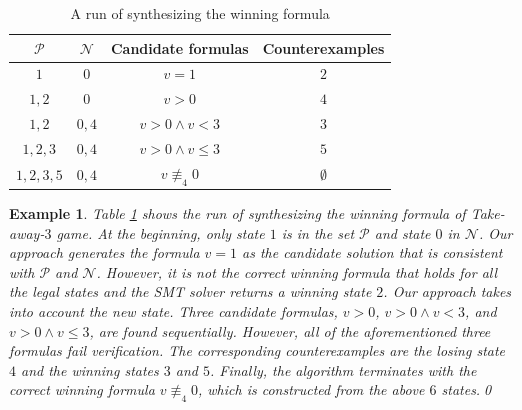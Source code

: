 \documentclass[review]{elsarticle}
\newcommand{\tuple}[1]{\langle {#1} \rangle}
\newcommand{\statevar}{\mathcal{X}}
\newcommand{\positiveSet}{\mathcal{P}}
\newcommand{\negativeSet}{\mathcal{N}}
\newcommand{\act}{\mathcal{A}}
\newcommand{\constraint}{\mathcal{C}}
\newcommand{\estate}{\mathcal{E}}
\newcommand{\nmodulo}{\not \equiv}
\newtheorem{example}{Example}
\newtheorem{theorem}{Theorem}
\begin{document}
        
        \begin{table}[!t]        	
		\small
        \centering        	
        	\begin{tabular}{|c|c|c|c|}
        		\hline
        		$\positiveSet$ & $\negativeSet$ & Candidate formulas & Counterexamples \\ \hline
        		$1$ & $0$ & $v = 1$ & $2$ \\ \hline
        		$1, 2$ & $0$ & $v > 0$ & $4$ \\ \hline
        		$1, 2$ & $0,4$ & $v > 0 \land v < 3$ & $3$\\ \hline
        		$1, 2, 3$ & $0,4$ & $v > 0 \land v \leq 3$ & $5$\\ \hline
				$1, 2, 3, 5$ & $0,4$ & $v \nmodulo_4 0$ & $\emptyset$\\ \hline
        	\end{tabular}
        	\caption{A run of synthesizing the winning formula}
        	\label{table:synWinForm}
        \end{table}

%    	
%
    
        \begin{example} \label{exm:synWinForm} \rm 
        Table \ref{table:synWinForm} shows the run of synthesizing the winning formula of Take-away-$3$ game.
        At the beginning, only state $1$ is in the set $\positiveSet$ and state $0$ in $\negativeSet$.
		Our approach generates the formula $v = 1$ as the candidate solution that is consistent with $\positiveSet$ and $\negativeSet$.
		However, it is not the correct winning formula that holds for all the legal states and the SMT solver returns a winning state $2$.
		Our approach takes into account the new state.
		Three candidate formulas, $v > 0$, $v > 0  \land  v < 3$, and $v > 0 \land v \leq 3$, are found sequentially.
		However, all of the aforementioned three formulas fail verification.
		The corresponding counterexamples are the losing state $4$ and the winning states $3$ and $5$.
        Finally, the algorithm terminates with the correct winning formula $v \nmodulo_4 0$, which is constructed from the above $6$ states.\qed
        \end{example}
        
\end{document}
